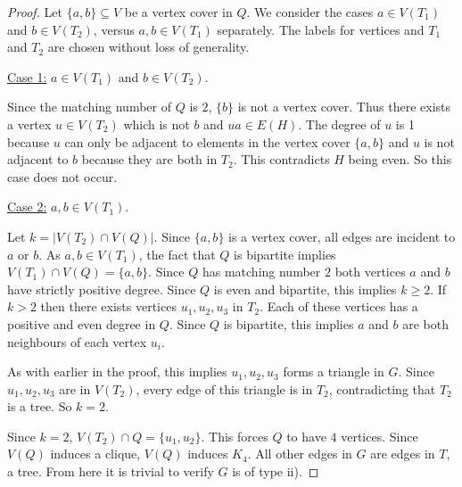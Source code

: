 \documentclass[10pt,a4paper]{amsart}
\begin{document}
\begin{proof}
Let $\{a,b\}\subseteq V$ be a vertex cover in $Q$.
We consider the cases 
$a \in V(T_1)$ and $b\in V(T_2)$, versus $a,b\in V(T_1)$ separately.
The labels for vertices and $T_1$ and $T_2$ are chosen without loss of generality.


\medskip
\noindent \underline{Case 1:} $a \in V(T_1)$ and $b\in V(T_2)$.
\medskip

Since the matching number of $Q$ is $2$, $\{b\}$ is not a vertex cover.
Thus there exists a vertex $u\in V(T_2)$ which is not $b$ and $ua\in E(H)$. The degree of $u$ is 1 because $u$ can only be adjacent to elements in the vertex cover $\{a,b\}$ and $u$ is not adjacent to $b$ because they are both in $T_2$.
This contradicts $H$ being even. So this case does not occur.

\medskip
\noindent \underline{Case 2:} $a,b \in V(T_1)$.
\medskip

Let $k = |V(T_2)\cap V(Q)|$.
Since $\{a,b\}$ is a vertex cover, all edges are incident to $a$ or $b$.
As $a,b \in V(T_1)$, the fact that $Q$ is bipartite implies $V(T_1)\cap V(Q) = \{a,b\}$.
Since $Q$ has matching number $2$
both vertices $a$ and $b$ have strictly positive degree.
Since $Q$ is even and bipartite, this implies $k\geq 2$.
If $k>2$ then there exists vertices $u_1,u_2,u_3$ in $T_2$.
Each of these vertices has a positive and even degree in $Q$.
Since $Q$ is bipartite, this implies $a$ and $b$ are both neighbours of each vertex $u_i$.

As with earlier in the proof, this implies $u_1,u_2,u_3$ forms a triangle in $G$.
Since $u_1,u_2,u_3$ are in $V(T_2)$, every edge of this triangle is in $T_2$, contradicting that $T_2$ is a tree.
So $k=2$.

Since $k=2$, $V(T_2)\cap Q = \{u_1,u_2\}$.
This forces $Q$ to have $4$ vertices.
Since $V(Q)$ induces a clique, $V(Q)$ induces $K_4$.
All other edges in $G$ are edges in $T$, a tree.
From here it is trivial to verify $G$ is of type ii).
\end{proof}
\end{document}
